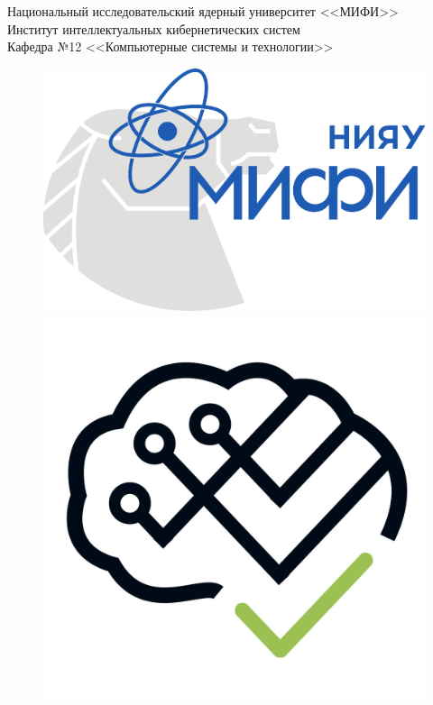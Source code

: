 \documentclass[12pt,a4paper,oneside]{article}
\begin{document}
\begin{titlepage}
    \begin{center}
      \begin{large}
        Национальный исследовательский ядерный университет <<МИФИ>> \\
        \vspace{0.25cm}
        Институт интеллектуальных кибернетических систем \\
        \vspace{0.25cm}
        Кафедра №12 <<Компьютерные системы и технологии>>
      \end{large}
  
      \vspace*{1cm}
  
      \begin{figure}[H]
        \centering
        \begin{minipage}[c]{0.3\textwidth}
          \includegraphics[width=\textwidth]{logo_university}
        \end{minipage}
        \hfill
        \begin{minipage}[c]{0.3\textwidth}
          \includegraphics[width=\textwidth]{logo_institute}

\end{minipage}
\end{figure}
\end{center}
\end{titlepage}
\end{document}
